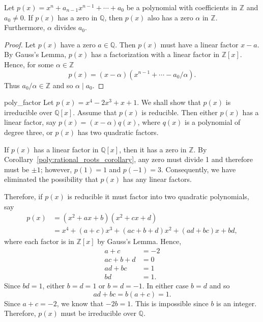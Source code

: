  
\begin{corollary}\label{poly:rational_roots_corollary}
Let $p(x) = x^n + a_{n-1} x^{n-1} + \cdots + a_0$ be  a polynomial
with coefficients in ${\mathbb Z}$ and $a_0 \neq 0$. If $p(x)$ has a zero
in ${\mathbb Q}$, then $p(x)$ also has a zero $\alpha$ in ${\mathbb Z}$.
Furthermore, $\alpha$ divides $a_0$.  
\end{corollary}
 
 
\begin{proof}
Let $p(x)$ have a zero $a \in {\mathbb Q}$. Then $p(x)$ must have a
linear factor $x-a$.  By Gauss's Lemma, $p(x)$ has a factorization
with a linear factor in ${\mathbb Z}[x]$. Hence, for some $\alpha \in
{\mathbb Z}$ 
\[
p(x) = (x - \alpha)( x^{n-1} + \cdots - a_0 / \alpha ).
\]
Thus $a_0 /\alpha \in {\mathbb Z}$ and so $\alpha \mid a_0$.
\end{proof}
 
 
\begin{example}{poly_factor}
Let $p(x) = x^4 - 2 x^3 + x + 1$. We shall show that $p(x)$ is
irreducible over ${\mathbb Q}[x]$.  Assume that $p(x)$ is reducible. Then
either $p(x)$ has a linear factor, say $p(x) = (x - \alpha) q(x)$,
where $q(x)$ is a polynomial of degree three, or $p(x)$ has two 
quadratic factors. 
 
 
If $p(x)$ has a linear factor in ${\mathbb Q}[x]$, then it has a zero in
${\mathbb Z}$.  By  Corollary~\ref{poly:rational_roots_corollary}, any zero must divide 1 and therefore
must be $\pm 1$; however, $p(1) = 1$ and $p(-1)= 3$. Consequently, we
have eliminated the possibility that $p(x)$ has any linear factors.   
 
 
Therefore, if $p(x)$ is reducible it must factor into two quadratic 
polynomials, say
\begin{align*}
p(x) & = (x^2 + ax + b )( x^2 + cx + d ) \\
& = x^4 + (a + c)x^3 + (ac + b + d)x^2 + (ad + bc)x + bd,
\end{align*}
where each factor is in ${\mathbb Z}[x]$ by Gauss's Lemma. Hence,
\begin{align*}
a + c & = - 2 \\
ac + b + d & = 0 \\
ad + bc & = 1 \\
bd & = 1.
\end{align*}
Since $bd = 1$, either $b = d = 1$ or $ b = d = -1$. In either case $b
= d$ and so 
\[
ad + bc  = b( a + c ) = 1.
\]
Since $a + c = -2$, we know that $-2b = 1$. This is impossible since
$b$ is an integer. Therefore, $p(x)$ must be irreducible over ${\mathbb
Q}$. 
\end{example}
 
